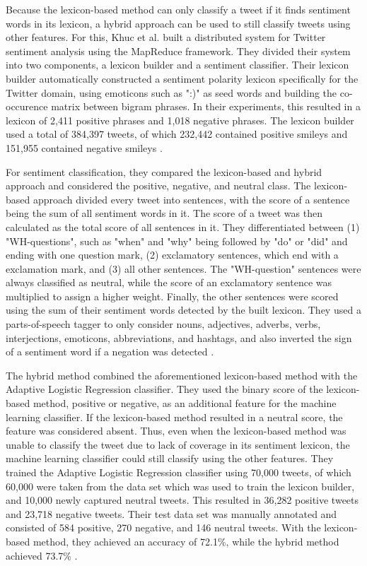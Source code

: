 Because the lexicon-based method can only classify a tweet if it finds sentiment words in its lexicon, a hybrid approach can be used to still classify tweets using other features. For this, Khuc et al. built a distributed system for Twitter sentiment analysis using the MapReduce framework. They divided their system into two components, a lexicon builder and a sentiment classifier. Their lexicon builder automatically constructed a sentiment polarity lexicon specifically for the Twitter domain, using emoticons such as ":)" as seed words and building the co-occurence matrix between bigram phrases. In their experiments, this resulted in a lexicon of 2,411 positive phrases and 1,018 negative phrases. The lexicon builder used a total of 384,397 tweets, of which 232,442 contained positive smileys and 151,955 contained negative smileys \cite{khuc}.

For sentiment classification, they compared the lexicon-based and hybrid approach and considered the positive, negative, and neutral class. The lexicon-based approach divided every tweet into sentences, with the score of a sentence being the sum of all sentiment words in it. The score of a tweet was then calculated as the total score of all sentences in it. They differentiated between (1) "WH-questions", such as "when" and "why" being followed by "do" or "did" and ending with one question mark, (2) exclamatory sentences, which end with a exclamation mark, and (3) all other sentences. The "WH-question" sentences were always classified as neutral, while the score of an exclamatory sentence was multiplied to assign a higher weight. Finally, the other sentences were scored using the sum of their sentiment words detected by the built lexicon. They used a parts-of-speech tagger to only consider nouns, adjectives, adverbs, verbs, interjections, emoticons, abbreviations, and hashtags, and also inverted the sign of a sentiment word if a negation was detected \cite{khuc}.

The hybrid method combined the aforementioned lexicon-based method with the Adaptive Logistic Regression classifier. They used the binary score of the lexicon-based method, positive or negative, as an additional feature for the machine learning classifier. If the lexicon-based method resulted in a neutral score, the feature was considered absent. Thus, even when the lexicon-based method was unable to classify the tweet due to lack of coverage in its sentiment lexicon, the machine learning classifier could still classify using the other features. They trained the Adaptive Logistic Regression classifier using 70,000 tweets, of which 60,000 were taken from the data set which was used to train the lexicon builder, and 10,000 newly captured neutral tweets. This resulted in 36,282 positive tweets and 23,718 negative tweets. Their test data set was manually annotated and consisted of 584 positive, 270 negative, and 146 neutral tweets. With the lexicon-based method, they achieved an accuracy of 72.1\%, while the hybrid method achieved 73.7\% \cite{khuc}.










